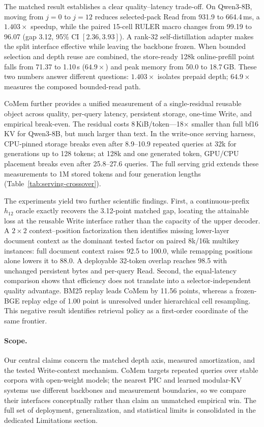 The matched result establishes a clear quality--latency trade-off. On
Qwen3-8B, moving from $j{=}0$ to $j{=}12$ reduces selected-pack Read from
931.9 to 664.4\,ms, a $1.403\times$ speedup, while the paired 15-cell RULER
macro changes from 99.19 to 96.07 (gap 3.12, 95\% CI $[2.36,3.93]$). A
rank-32 self-distillation adapter makes the split interface effective while
leaving the backbone frozen. When bounded selection and depth reuse are
combined, the store-ready 128k online-prefill point falls from 71.37 to
1.10\,s ($64.9\times$) and peak memory from 50.0 to 18.7\,GB. These two
numbers answer different questions: $1.403\times$ isolates prepaid depth;
$64.9\times$ measures the composed bounded-read path.

CoMem further provides a unified measurement of a
single-residual reusable object across quality, per-query latency, persistent
storage, one-time Write, and empirical break-even. The residual costs
8\,KiB/token---18$\times$ smaller than full bf16 KV for Qwen3-8B, but much
larger than text. In the write-once serving harness, CPU-pinned storage breaks
even after 8.9--10.9 repeated queries at 32k for generations up to 128 tokens;
at 128k and one generated token, GPU/CPU placement breaks even after
25.8--27.6 queries. The full serving grid extends these measurements to 1M
stored tokens and four generation lengths (Table~\ref{tab:serving-crossover}).

The experiments yield two further scientific findings. First, a
continuous-prefix $h_{12}$ oracle exactly recovers the 3.12-point matched gap,
locating the attainable loss at the reusable Write interface rather than the
capacity of the upper decoder. A $2{\times}2$ context--position factorization
then identifies missing lower-layer document context as the dominant tested
factor on paired 8k/16k multikey instances: full document context raises 92.5
to 100.0, while remapping positions alone lowers it to 88.0. A deployable
32-token overlap reaches 98.5 with unchanged persistent bytes and per-query
Read. Second, the equal-latency comparison shows that efficiency does not
translate into a selector-independent quality advantage. BM25 replay leads
CoMem by 11.56 points, whereas a frozen-BGE replay edge of 1.00 point is
unresolved under hierarchical cell resampling. This negative result identifies
retrieval policy as a first-order coordinate of the same frontier.

\paragraph{Scope.}
Our central claims concern the matched depth axis, measured amortization, and
the tested Write-context mechanism. CoMem targets repeated queries over stable
corpora with open-weight models; the nearest PIC and learned modular-KV systems
use different backbones and measurement boundaries, so we compare their
interfaces conceptually rather than claim an unmatched empirical win. The full
set of deployment, generalization, and statistical limits is consolidated in
the dedicated Limitations section.


